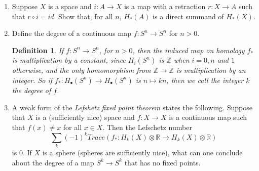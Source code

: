 \documentclass{article}
\newtheorem*{definition}{Definition}
\begin{document}
\begin{enumerate}
	\begin{proof}
	
	\end{proof}
	
	\item Suppose $X$ is a space and $i:A \rightarrow X$ is a map with a retraction 
	$r: X \rightarrow A$ such that $r \circ i = id$. Show that, for all $n$, $H_*(A)$ is
	a direct summand of $H_*(X)$.
	
	
	\item Define the degree of a continuous map $f: S^n \rightarrow S^n$ for $n > 0$.
	
	\begin{definition}
	If $f:S^n \rightarrow S^n$, for $n > 0$, then the induced map on homology $f_*$ is
	multiplication by a constant, since $H_i(S^n) $ is $\mathbb{Z}$ 
	when $i=0,n$ and $1$ otherwise, and the only homomorphism from 
	$\mathbb{Z} \rightarrow \mathbb{Z}$ is multiplication by an integer.
	So if $f_*: H_\bullet(S^n) \rightarrow H_\bullet(S^n)$ is $n \mapsto kn$,
	then we call the integer $k$ the degree of $f$.
	\end{definition}
	
	\item A weak form of the \textit{Lefshetz fixed point theorem} states the following.
	Suppose that $X$ is a (sufficiently nice) space and $f: X \rightarrow X$ is a 
	continuous map such that $f(x) \neq x$ for all $x \in X$. Then the Lefschetz number
	\[ \sum_k(-1)^kTrace(f_* : H_k(X) \otimes \mathbb{R} \rightarrow H_k(X) 
	\otimes \mathbb{R} ) \]
	is $0$. 
	If $X$ is a sphere (spheres are sufficiently nice), what can one conclude about 
	the degree of a map $S^k \rightarrow S^k$ that has no fixed points.
	
\end{enumerate}
\end{document}
